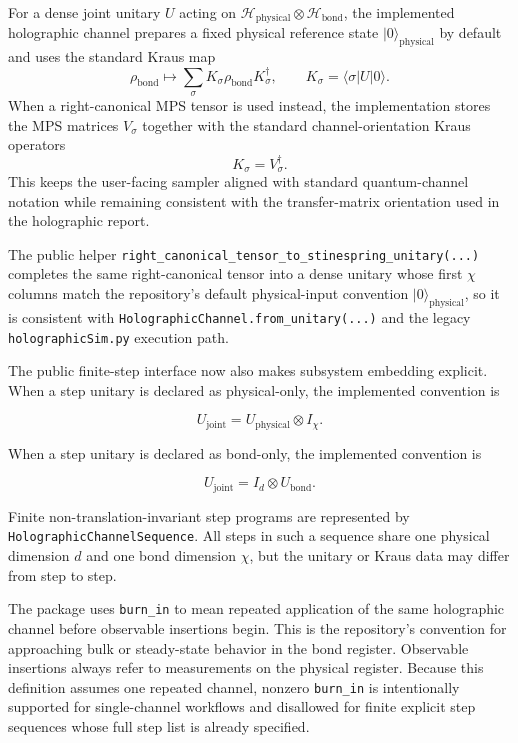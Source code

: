 \documentclass[11pt]{article}
\begin{document}
\noindent
For a dense joint unitary \(U\) acting on
\(\mathcal{H}_{\mathrm{physical}} \otimes \mathcal{H}_{\mathrm{bond}}\), the
implemented holographic channel prepares a fixed physical reference state
\(|0\rangle_{\mathrm{physical}}\) by default and uses the standard Kraus map
\[
\rho_{\mathrm{bond}}
\mapsto
\sum_\sigma K_\sigma \rho_{\mathrm{bond}} K_\sigma^\dagger,
\qquad
K_\sigma = \langle \sigma | U | 0 \rangle.
\]
When a right-canonical MPS tensor is used instead, the implementation stores the
MPS matrices \(V_\sigma\) together with the standard channel-orientation Kraus
operators
\[
K_\sigma = V_\sigma^\dagger.
\]
This keeps the user-facing sampler aligned with standard quantum-channel
notation while remaining consistent with the transfer-matrix orientation used in
the holographic report.

\noindent
The public helper
\texttt{right\_canonical\_tensor\_to\_stinespring\_unitary(...)} completes the
same right-canonical tensor into a dense unitary whose first \(\chi\) columns
match the repository's default physical-input convention
\(|0\rangle_{\mathrm{physical}}\), so it is consistent with
\texttt{HolographicChannel.from\_unitary(...)} and the legacy
\texttt{holographicSim.py} execution path.

\noindent
The public finite-step interface now also makes subsystem embedding explicit.
When a step unitary is declared as physical-only, the implemented convention is

\[
U_{\mathrm{joint}} = U_{\mathrm{physical}} \otimes I_{\chi}.
\]

\noindent
When a step unitary is declared as bond-only, the implemented convention is

\[
U_{\mathrm{joint}} = I_{d} \otimes U_{\mathrm{bond}}.
\]

\noindent
Finite non-translation-invariant step programs are represented by
\texttt{HolographicChannelSequence}. All steps in such a sequence share one
physical dimension \(d\) and one bond dimension \(\chi\), but the unitary or
Kraus data may differ from step to step.

\noindent
The package uses \texttt{burn\_in} to mean repeated application of the same
holographic channel before observable insertions begin. This is the repository's
convention for approaching bulk or steady-state behavior in the bond register.
Observable insertions always refer to measurements on the physical register.
Because this definition assumes one repeated channel, nonzero \texttt{burn\_in}
is intentionally supported for single-channel workflows and disallowed for
finite explicit step sequences whose full step list is already specified.
\end{document}
